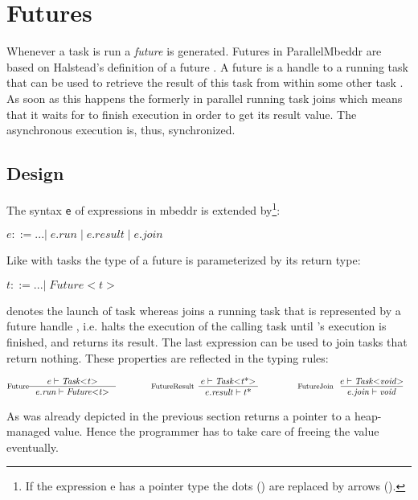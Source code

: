 \section{Futures}
Whenever a task  is run a \textit{future} is generated. Futures in ParallelMbeddr are based on Halstead's definition of a future \cite{Halstead_Multilisp}. A future is a handle to a running task that can be used to retrieve the result of this task from within some other task . As soon as this happens the formerly in parallel running task  joins  which means that it waits for  to finish execution in order to get its result value. The asynchronous execution is, thus, synchronized.

\subsection{Design}
The syntax \texttt{e} of expressions in mbeddr is extended by\footnote{If the expression e has a pointer type the dots () are replaced by arrows (\CODE{->}).}:

$ e ::= ...|\;e.\mathit{run}\;|\;e.\mathit{result}\;|\;e.\mathit{join} $

Like with tasks the type of a future is parameterized by its return type:

$ t ::= ...|\;\mathit{Future{<}t{>}}$

 denotes the launch of task  whereas  joins a running task that is represented by a future handle , i.e. halts the execution of the calling task until 's execution is finished, and returns its result. The last expression  can be used to join tasks that return nothing. These properties are reflected in the typing rules:

\begin{center}
\begin{align*}
\inference*[Future]{e |- \mathit{Task{<}t{>}}}{e.\mathit{run} |- \mathit{Future{<}t{>}}}
\qquad\qquad
\inference*[FutureResult]{e |- \mathit{Task{<}t\text{*}{>}}}{e.\mathit{result} |- t\text{*}}
\qquad\qquad
\inference*[FutureJoin]{e |- \mathit{Task{<}void{>}}}{e.\mathit{join} |- \mathit{void}}
\end{align*}
\end{center}

As was already depicted in the previous section  
 returns a pointer to a heap-managed value. Hence the programmer has to take care of freeing the value eventually.

